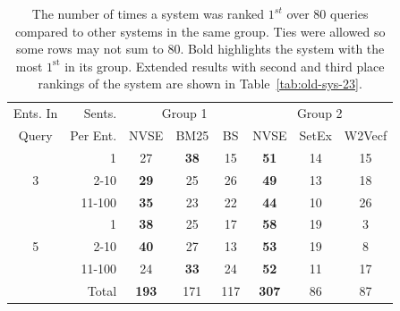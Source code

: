 \documentclass[a4paper]{article}
\newcommand{\tabref}[1]{Table~\ref{#1}}
\newcommand{\fb}[1]{\textbf{#1}}
\newcommand{\wTv}{Word2Vecf\xspace}
\newcommand{\setX}{SetExpan\xspace}
\newcommand{\nvge}{NVSE\xspace}
\begin{document}

\begin{table}[t]%
  \setlength{\tabcolsep}{1.75pt}
  \centering
\begin{tabular}{|c@{\hskip 1pt}|r|ccc||ccc|}\hline
  {\small Ents$.$ In}  & {\small Sents. }  &          \multicolumn{3}{c||}{Group 1}      &          \multicolumn{3}{c|}{Group 2}       \\[-2pt]\cline{3-8}
  {\small Query} & {\small Per Ent.} & {\small \nvge}    & {\small BM25}    & {\small BS}  & {\small \nvge}    & {\small SetEx}   & {\small W2Vecf} \\\hline
            & 1          & 27       & \fb{38} & 15  & \fb{51}  & 14      & 15    \\[-1pt]
3           & 2-10       & \fb{29}  & 25      & 26  & \fb{49}  & 13      & 18    \\[-1pt]
            & 11-100     & \fb{35}  & 23      & 22  & \fb{44}  & 10      & 26    \\[-1pt]\hline
            & 1          & \fb{38}  & 25      & 17  & \fb{58}  & 19      & 3     \\[-1pt]
5           & 2-10       & \fb{40}  & 27      & 13  & \fb{53}  & 19      & 8     \\[-1pt]
            & 11-100     & 24       & \fb{33} & 24  & \fb{52}  & 11      & 17    \\[-1pt]\hline\hline
            & Total      & \fb{193} & 171     & 117 & \fb{307} & 86      & 87    \\[0pt]\hline
\end{tabular}
\caption{The number of times a system was ranked $1^{st}$ over 80 queries compared to other systems in the same group. Ties were allowed so some rows may not sum to 80. Bold highlights the system with the most $1^{\text{st}}$ in its group. Extended results with second and third place rankings of the system are shown in \tabref{tab:old-sys-23}.}
\label{tab:old-sys}
\end{table}
\end{document}
